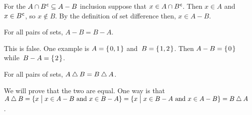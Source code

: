\documentclass{ibl}  %
\begin{document}
\begin{problem}
\begin{exes}
\begin{answer}
  For the $A\cap{B}^{\mspace{1mu}\mathsf{c}}\subseteq A-B$ inclusion suppose that
  $x\in A\cap{B}^{\mspace{1mu}\mathsf{c}}$.
  Then $x\in A$ and $x\in{B}^{\mspace{1mu}\mathsf{c}}$, so $x\notin B$.
  By the definition of set difference then, $x\in A-B$.  
\end{answer}
\begin{exercise}[\midlength] 
  For all pairs of sets, $A-B=B-A$.
\end{exercise}
\begin{answer}
  This is false.
  One example is $A=\mbox{$\{\hspace{0.1em}0,1\hspace{0.1em}\}$}$ and~$B=\mbox{$\{\hspace{0.1em}1,2\hspace{0.1em}\}$}$.
  Then $A-B=\mbox{$\{\hspace{0.1em}0\hspace{0.1em}\}$}$ while~$B-A=\mbox{$\{\hspace{0.1em}2\hspace{0.1em}\}$}$.  
\end{answer}
\begin{exercise} 
  For all pairs of sets, $A\mathbin{\triangle} B=B\mathbin{\triangle} A$.
\end{exercise}
\begin{answer}
  We will prove that the two are equal.
  One way is that 
  $A\mathbin{\triangle} B=\{x \bigm| \text{$x\in A-B$ and $x\in B-A$}\}
              =\{x \bigm| \text{$x\in B-A$ and $x\in A-B$}\}
              =B\mathbin{\triangle} A$.  
\end{answer}
\end{exes}

  
\end{problem}
\end{document}
